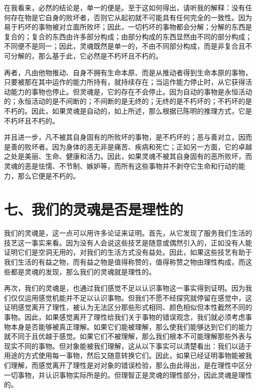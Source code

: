 在我看来，必然的结论是，单一的便是。至于这如何得出，请听我的解释：没有任何存在物是它自身的败坏者，否则它从起初就不可能具有任何完全的一致性。因为易于朽坏的事物被对立面所败坏；因此，一切朽坏的事物都会分解；分解的东西是复合的；复合的东西由许多部分构成；由部分构成的东西显然由不同的部分构成；不同便不是同一；因此，灵魂既然是单一的，不由不同部分构成，而是非复合且不可分解的，那么基于此，它必然是不朽坏且不朽的。\par

再者，凡由他物推动、自身不拥有生命本原、而是从推动者得到生命本原的事物，只要被那在其中运作的能力所持有，就持续存在；当运作能力停止时，从它获得活动能力的事物也停止。但灵魂是，它的存在不会停止。因为自动的事物是永恒活动的；永恒活动的是不间断的；不间断的是无终的；无终的是不朽坏的；不朽坏的是不朽的。因此，如果灵魂是自动的，如上所述，那么根据已陈明的推理方式，它是不朽坏且不朽的。\par

并且进一步，凡不被其自身固有的所败坏的事物，是不朽坏的；恶与善对立，因而是善的败坏者。因为身体的恶无非是痛苦、疾病和死亡；正如另一方面，它的卓越之处是美丽、生命、健康和活力。因此，如果灵魂不被其自身固有的恶所败坏，而灵魂的恶是怯懦、不节制、嫉妒等，而所有这些事物并不剥夺它生命和行动的能力，那么它便是不朽的。\par


\section{七、我们的灵魂是否是理性的}

我们的灵魂是，这一点可以用许多论证来证明。首先，从它发现了服务我们生活的技艺这一事实来看。因为没有人会说这些技艺是随意或偶然引入的，正如没有人能证明它们是空洞无用的，对我们的生活方式没有益处。因此，如果这些技艺有助于我们生活的有益之物，而有益之物是值得称赞的，值得称赞之物由理性构成，而这些都是灵魂的发现，那么我们的灵魂就是理性的。\par

再次，我们的灵魂是，也通过我们感觉不足以认识事物这一事实得到证明。因为我们仅仅运用感觉机能并不足以认识事物。但我们不愿不经探究就停留在感觉中，这证明感觉离开了理性，被认为无法区分那些形式相同、颜色相似但本性截然不同的事物。因此，如果感觉离开了理性给我们关于事物的错误观念，我们就必须考虑事物本身是否能够被真正理解。如果它们能被理解，那么使我们能够达到它们的能力就不同于且优越于感觉。如果它们不被理解，那么我们根本不可能理解那些外表与现实不同的事物。但对象能被我们理解，这从以下事实可以清楚看出：我们以适于用途的方式使用每一事物，然后又随意转换它们。因此，如果已经证明事物能被我们理解，而感觉离开了理性是对对象的错误检验，那么由此得出，是在理性中区分一切事物，并认识事物实际所是的。但理智正是灵魂的理性部分，因此灵魂是理性的。\par

